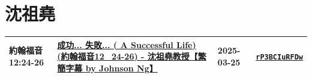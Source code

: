 \documentclass{book}
\begin{document}
\chapter{沈祖堯}\label{ch:preacher7}
\begin{multicols}{3}
\minitoc
\end{multicols}
{ \scriptsize


\begin{xltabular}{\textwidth}{|p{0.15\textwidth} p{0.6\textwidth}|p{0.07\textwidth} p{0.1\textwidth}|}
\hline
約翰福音 12:24-26 & \hyperref[sec:rP3BCIuRFDw]{成功... 失敗... ( A Successful Life) (約翰福音12\_24-26) - 沈祖堯教授【繁簡字幕 by Johnson Ng】} & 2025-03-25 & \href{https://youtube.com/watch?v=rP3BCIuRFDw}{\texttt{rP3BCIuRFDw}} \\
\hline
\end{xltabular}
}
\newpage
\end{document}

